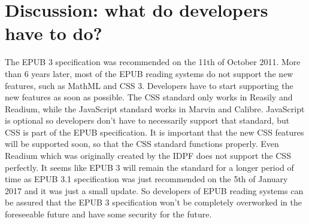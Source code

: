 \section{Discussion: what do developers have to do?}

The EPUB 3 specification \cite{EPUBspecs} was recommended on the 11th of October 2011. More than 6 years later, most of the EPUB reading systems do not support the new features, such as MathML and CSS 3. Developers have to start supporting the new features as soon as possible. The CSS standard only works in Reasily and Readium, while the JavaScript standard  works in Marvin and Calibre. JavaScript is optional so developers don't have to necessarily support that standard, but CSS is part of the EPUB specification. It is important that the new CSS features will be supported soon, so that the CSS standard functions properly. Even Readium which was originally created by the IDPF does not support the CSS perfectly. It seems like EPUB 3 will remain the standard for a longer period of time as EPUB 3.1 specification was just recommended on the 5th of January 2017 and it was just a small update. So developers of EPUB reading systems can be assured that the EPUB 3 specification won't be completely overworked in the foreseeable future and have some security for the future. 

